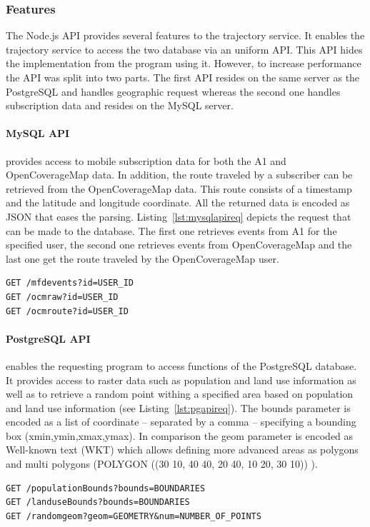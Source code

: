 \subsubsection{Features}
The Node.js API provides several features to the trajectory service. It enables the trajectory service to access the two database via an uniform API. This API hides the implementation from the program using it. However, to increase performance the API was split into two parts. The first API resides on the same server as the PostgreSQL and handles geographic request whereas the second one handles subscription data and resides on the MySQL server.

\paragraph{MySQL API}
provides access to mobile subscription data for both the A1 and OpenCoverageMap data. In addition, the route traveled by a subscriber can be retrieved from the OpenCoverageMap data. This route consists of a timestamp and the latitude and longitude coordinate. All the returned data is encoded as JSON that eases the parsing. Listing~\ref{lst:mysqlapireq} depicts the request that can be made to the database. The first one retrieves events from A1 for the specified user, the second one retrieves events from OpenCoverageMap and the last one get the route traveled by the OpenCoverageMap user.
\begin{lstlisting}[style=BashInputStyle,caption={MySQL API requests},label={lst:mysqlapireq}]
GET /mfdevents?id=USER_ID
GET /ocmraw?id=USER_ID
GET /ocmroute?id=USER_ID
\end{lstlisting}

\paragraph{PostgreSQL API}
enables the requesting program to access functions of the PostgreSQL database. It provides access to raster data such as population and land use information as well as to retrieve a random point withing a specified area based on population and land use information (see Listing~\ref{lst:pgapireq}). The bounds parameter is encoded as a list  of coordinate -- separated by a comma -- specifying a bounding box (xmin,ymin,xmax,ymax). In comparison the geom parameter is encoded as Well-known text (WKT) which allows defining more advanced areas as polygons and multi polygons (POLYGON ((30 10, 40 40, 20 40, 10 20, 30 10))
).
\begin{lstlisting}[style=BashInputStyle,caption={PostgreSQL API requests},label={lst:pgapireq}]
GET /populationBounds?bounds=BOUNDARIES
GET /landuseBounds?bounds=BOUNDARIES
GET /randomgeom?geom=GEOMETRY&num=NUMBER_OF_POINTS
\end{lstlisting}


